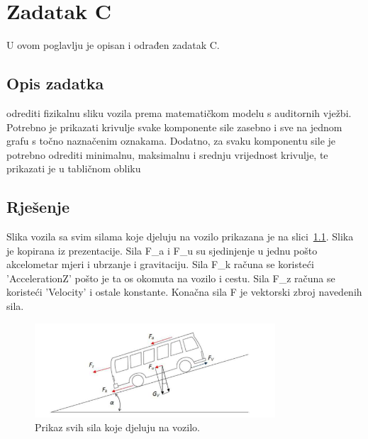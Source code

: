 \chapter{Zadatak C} \label{ch:c}

U ovom poglavlju je opisan i odrađen zadatak C.

\section{Opis zadatka} \label{sec:c:opis}
odrediti fizikalnu sliku vozila prema matematičkom modelu s auditornih vježbi. Potrebno je prikazati
krivulje svake komponente sile zasebno i sve na jednom grafu s točno naznačenim oznakama.
Dodatno, za svaku komponentu sile je potrebno odrediti minimalnu, maksimalnu i srednju vrijednost
krivulje, te prikazati je u tabličnom obliku

\section{Rješenje} \label{sec:c:rjesenje}

Slika vozila sa svim silama koje djeluju na vozilo prikazana je na
slici~\ref{fig:c:forces}. Slika je kopirana iz prezentacije. Sila F\_a i F\_u su
sjedinjenje u jednu pošto akcelometar mjeri i ubrzanje i gravitaciju. Sila F\_k
računa se koristeći 'AccelerationZ' pošto je ta os okomuta na vozilo i cestu.
Sila F\_z računa se koristeći 'Velocity' i ostale konstante.
Konačna sila F je vektorski zbroj navedenih sila.


\begin{figure}
    \centering
    \includegraphics[width=0.8\textwidth]{images/vehicle.png}
    \caption{Prikaz svih sila koje djeluju na vozilo.}
    \label{fig:c:forces}
\end{figure}

